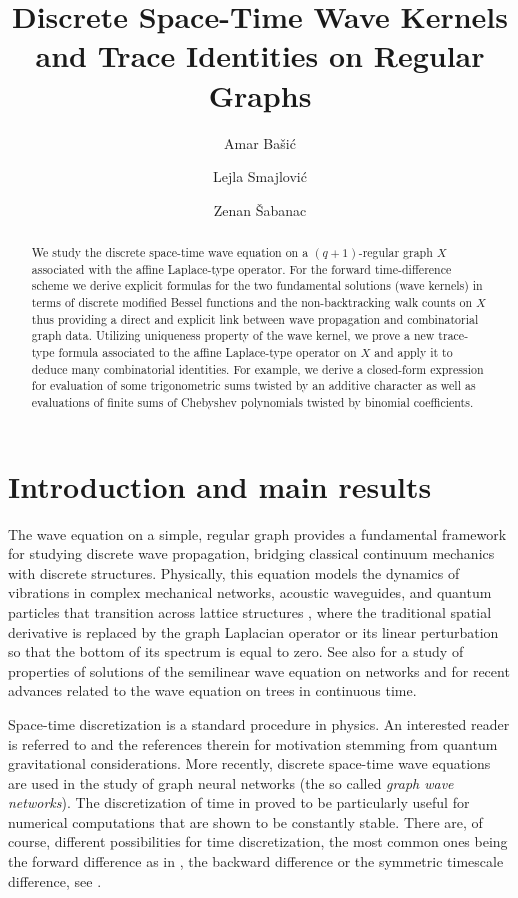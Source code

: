 \documentclass[reqno,10pt]{amsart}
\title{Discrete Space-Time Wave Kernels and Trace Identities on Regular Graphs}
\author{Amar Ba\v{s}i\'{c}}
\author{Lejla Smajlovi\'c}
\author{Zenan \v{S}abanac}
\theoremstyle{definition}
\numberwithin{equation}{section}
\begin{document}
\begin{abstract}
We study the discrete space-time wave equation on a $(q+1)$-regular graph $X$ associated with the affine Laplace-type operator. For the forward time-difference scheme we derive explicit formulas for the two fundamental solutions (wave kernels) in terms of discrete modified Bessel functions and the non-backtracking walk counts on $X$ thus  providing a direct and explicit link between wave propagation and combinatorial graph data. Utilizing uniqueness property of the wave kernel, we prove a new trace-type formula associated to the affine Laplace-type operator on $X$ and apply it to deduce many combinatorial identities. For example, we derive a closed-form expression for evaluation of some trigonometric sums twisted by an additive character as well as evaluations of finite sums of Chebyshev polynomials twisted by binomial coefficients. 
\end{abstract}

\maketitle

\section{Introduction and main results}  

The wave equation on a simple, regular graph provides a fundamental framework for studying discrete wave propagation, bridging classical continuum mechanics with discrete structures. Physically, this equation models the dynamics of vibrations in complex mechanical networks, acoustic waveguides, and quantum particles that transition across lattice structures \cite{BO11, Sm07}, where the traditional spatial derivative is replaced by the graph Laplacian operator \cite{Ch97, FT04} or its linear perturbation \cite{MS99, Pe25} so that the bottom of its spectrum is equal to zero. See also  \cite{Ch22} for a study of properties of solutions of the semilinear wave equation on networks and \cite{CNT23, TS16} for recent advances related to the wave equation on trees in continuous time.

 Space-time discretization is a standard procedure in physics. An interested reader is referred to \cite{tH16} and the references therein for motivation stemming from quantum gravitational considerations. More recently, discrete space-time wave equations are used in the study of graph neural networks \cite{Yue+25} (the so called \textit{graph wave networks}). The discretization of time in \cite{Yue+25} proved to be particularly useful for numerical computations that are shown to be constantly stable. There are, of course, different possibilities for time discretization, the most common ones being the forward difference as in \cite{BSS26, Pe25}, the backward difference \cite{BSS24, KS23} or the symmetric timescale difference, see \cite{CP94, GNHS25}.
\end{document}

